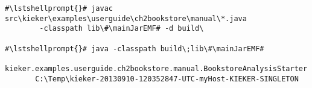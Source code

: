 \begin{lstlisting}[caption=Commands to compile and run the analysis under Windows,label=lst:bookstoreAnalysisStarterWin]
#\lstshellprompt{}# javac src\kieker\examples\userguide\ch2bookstore\manual\*.java 
        -classpath lib\#\mainJarEMF# -d build\

#\lstshellprompt{}# java -classpath build\;lib\#\mainJarEMF#
       kieker.examples.userguide.ch2bookstore.manual.BookstoreAnalysisStarter 
       C:\Temp\kieker-20130910-120352847-UTC-myHost-KIEKER-SINGLETON
\end{lstlisting}	

